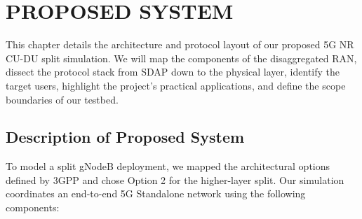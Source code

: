 \chapter{PROPOSED SYSTEM}

\justify
This chapter details the architecture and protocol layout of our proposed 5G NR CU-DU split simulation. We will map the components of the disaggregated RAN, dissect the protocol stack from SDAP down to the physical layer, identify the target users, highlight the project's practical applications, and define the scope boundaries of our testbed.

\section{Description of Proposed System}
\justify
To model a split gNodeB deployment, we mapped the architectural options defined by 3GPP and chose Option 2 for the higher-layer split. Our simulation coordinates an end-to-end 5G Standalone network using the following components:


